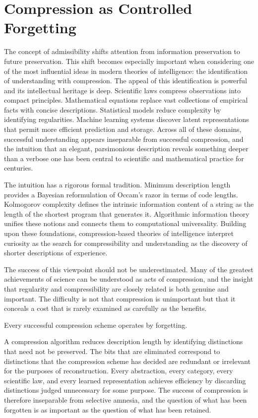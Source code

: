 \documentclass[12pt,a4paper]{article}
\theoremstyle{plain}
\theoremstyle{definition}
\theoremstyle{remark}
\begin{document}
\section{Compression as Controlled Forgetting}

The concept of admissibility shifts attention from information preservation
to future preservation. This shift becomes especially important when
considering one of the most influential ideas in modern theories of
intelligence: the identification of understanding with compression. The
appeal of this identification is powerful and its intellectual heritage is
deep. Scientific laws compress observations into compact principles.
Mathematical equations replace vast collections of empirical facts with
concise descriptions. Statistical models reduce complexity by identifying
regularities. Machine learning systems discover latent representations that
permit more efficient prediction and storage. Across all of these domains,
successful understanding appears inseparable from successful compression, and
the intuition that an elegant, parsimonious description reveals something
deeper than a verbose one has been central to scientific and mathematical
practice for centuries.

The intuition has a rigorous formal tradition. Minimum description length
provides a Bayesian reformulation of Occam's razor in terms of code lengths.
Kolmogorov complexity defines the intrinsic information content of a string
as the length of the shortest program that generates it. Algorithmic
information theory unifies these notions and connects them to computational
universality. Building upon these foundations, compression-based theories of
intelligence interpret curiosity as the search for compressibility and
understanding as the discovery of shorter descriptions of experience.

The success of this viewpoint should not be underestimated. Many of the
greatest achievements of science can be understood as acts of compression,
and the insight that regularity and compressibility are closely related is
both genuine and important. The difficulty is not that compression is
unimportant but that it conceals a cost that is rarely examined as carefully
as the benefits.

Every successful compression scheme operates by forgetting.

A compression algorithm reduces description length by identifying distinctions
that need not be preserved. The bits that are eliminated correspond to
distinctions that the compression scheme has decided are redundant or
irrelevant for the purposes of reconstruction. Every abstraction, every
category, every scientific law, and every learned representation achieves
efficiency by discarding distinctions judged unnecessary for some purpose.
The success of compression is therefore inseparable from selective amnesia,
and the question of what has been forgotten is as important as the question
of what has been retained.
\end{document}
